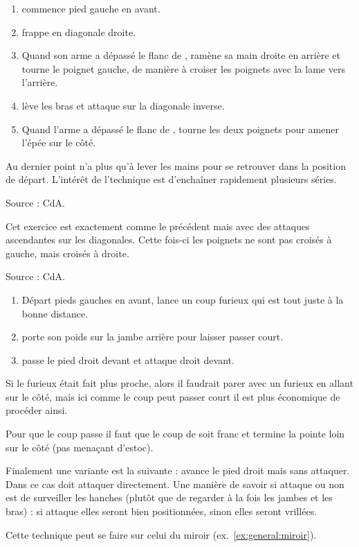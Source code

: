 \begin{exercice}

\begin{enumerate}
	\item \A commence pied gauche en avant.
	\item \A frappe en diagonale droite.
	\item Quand son arme a dépassé le flanc de \D, \A ramène sa main droite en arrière et tourne le poignet gauche, de manière à croiser les poignets avec la lame vers l'arrière.
	\item \A lève les bras et attaque sur la diagonale inverse.
	\item Quand l'arme a dépassé le flanc de \D, \A tourne les deux poignets pour amener l'épée sur le côté.
\end{enumerate}

Au dernier point \A n'a plus qu'à lever les mains pour se retrouver dans la position de départ. L'intérêt de l'technique est d'enchaîner rapidement plusieurs séries.

Source : CdA.
\end{exercice}


\begin{exercice}
Cet exercice est exactement comme le précédent mais avec des attaques ascendantes sur les diagonales. Cette fois-ci les poignets ne sont pas croisés à gauche, mais croisés à droite.

Source : CdA.
\end{exercice}


\begin{technique}

\begin{enumerate}
	\item Départ pieds gauches en avant, \A lance un coup furieux qui est tout juste à la bonne distance.
	\item \D porte son poids sur la jambe arrière pour laisser passer court.
	\item \D passe le pied droit devant et attaque droit devant.
\end{enumerate}

Si le furieux était fait plus proche, alors il faudrait parer avec un furieux en allant sur le côté, mais ici comme le coup peut passer court il est plus économique de procéder ainsi.

Pour que le coup passe il faut que le coup de \D soit franc et termine la pointe loin sur le côté (pas menaçant d'estoc).

Finalement une variante est la suivante : \A avance le pied droit mais sans attaquer. Dans ce cas \D doit attaquer directement. Une manière de savoir si \A attaque ou non est de surveiller les hanches (plutôt que de regarder à la fois les jambes et les bras) : si \A attaque elles seront bien positionnées, sinon elles seront vrillées.

Cette technique peut se faire sur celui du miroir (ex.~\ref{ex:general:miroir}).
\end{technique}


